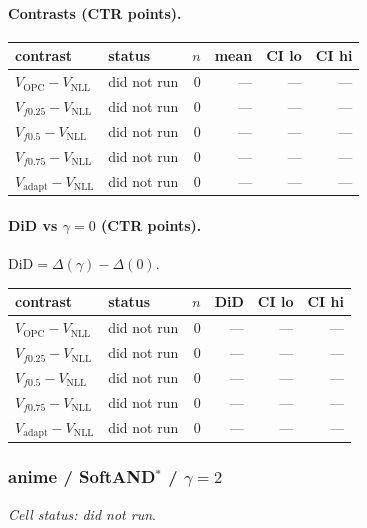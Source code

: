 \documentclass[10pt,a4paper]{article}
\begin{document}
\paragraph{Contrasts (CTR points).}
{\centering\small\begin{tabular}{llrrrr}
\toprule contrast & status & $n$ & mean & CI lo & CI hi \\
\midrule
$V_{\mathrm{OPC}}-V_{\mathrm{NLL}}$ & did not run & 0 & --- & --- & --- \\
$V_{f0.25}-V_{\mathrm{NLL}}$ & did not run & 0 & --- & --- & --- \\
$V_{f0.5}-V_{\mathrm{NLL}}$ & did not run & 0 & --- & --- & --- \\
$V_{f0.75}-V_{\mathrm{NLL}}$ & did not run & 0 & --- & --- & --- \\
$V_{\mathrm{adapt}}-V_{\mathrm{NLL}}$ & did not run & 0 & --- & --- & --- \\
\bottomrule\end{tabular}\par}
\paragraph{DiD vs $\gamma=0$ (CTR points).} $\mathrm{DiD}=\Delta(\gamma)-\Delta(0)$.
{\centering\small\begin{tabular}{llrrrr}
\toprule contrast & status & $n$ & DiD & CI lo & CI hi \\
\midrule
$V_{\mathrm{OPC}}-V_{\mathrm{NLL}}$ & did not run & 0 & --- & --- & --- \\
$V_{f0.25}-V_{\mathrm{NLL}}$ & did not run & 0 & --- & --- & --- \\
$V_{f0.5}-V_{\mathrm{NLL}}$ & did not run & 0 & --- & --- & --- \\
$V_{f0.75}-V_{\mathrm{NLL}}$ & did not run & 0 & --- & --- & --- \\
$V_{\mathrm{adapt}}-V_{\mathrm{NLL}}$ & did not run & 0 & --- & --- & --- \\
\bottomrule\end{tabular}\par}
\bigskip
\subsubsection{anime / SoftAND$^*$ / $\gamma=2$}
\emph{Cell status: did not run}.
\end{document}
